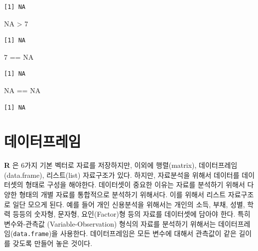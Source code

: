 \documentclass[
  letterpaper,
  chapter,a4paper,showtrims,openright,hidelinks]{oblivoir}
\newenvironment{Shaded}{\begin{snugshade}}{\end{snugshade}}
\newcommand{\ConstantTok}[1]{\textcolor[rgb]{0.56,0.35,0.01}{#1}}
\newcommand{\DecValTok}[1]{\textcolor[rgb]{0.68,0.00,0.00}{#1}}
\newcommand{\SpecialCharTok}[1]{\textcolor[rgb]{0.37,0.37,0.37}{#1}}
\begin{document}
\begin{verbatim}
[1] NA
\end{verbatim}

\begin{Shaded}
\begin{Highlighting}[]
\ConstantTok{NA} \SpecialCharTok{\textgreater{}} \DecValTok{7}
\end{Highlighting}
\end{Shaded}

\begin{verbatim}
[1] NA
\end{verbatim}

\begin{Shaded}
\begin{Highlighting}[]
\DecValTok{7} \SpecialCharTok{==} \ConstantTok{NA}
\end{Highlighting}
\end{Shaded}

\begin{verbatim}
[1] NA
\end{verbatim}

\begin{Shaded}
\begin{Highlighting}[]
\ConstantTok{NA} \SpecialCharTok{==} \ConstantTok{NA}
\end{Highlighting}
\end{Shaded}

\begin{verbatim}
[1] NA
\end{verbatim}

\hypertarget{uxb370uxc774uxd130uxd504uxb808uxc784}{%
\chapter{데이터프레임}\label{uxb370uxc774uxd130uxd504uxb808uxc784}}

\textbf{R} 은 6가지 기본 벡터로 자료를 저장하지만, 이외에 행렬(matrix),
데이터프레임(data.frame), 리스트(list) 자료구조가 있다. 하지만,
자료분석을 위해서 데이터를 데이터셋의 형태로 구성을 해야한다. 데이터셋이
중요한 이유는 자료를 분석하기 위해서 다양한 형태의 개별 자료를
통합적으로 분석하기 위해서다. 이를 위해서 리스트 자료구조로 일단 모으게
된다. 예를 들어 개인 신용분석을 위해서는 개인의 소득, 부채, 성별, 학력
등등의 숫자형, 문자형, 요인(Factor)형 등의 자료를 데이터셋에 담아야
한다. 특히 변수와-관측값 (Variable-Observation) 형식의 자료를 분석하기
위해서는 데이터프레임(\texttt{data.frame})을 사용한다. 데이터프레임은
모든 변수에 대해서 관측값이 같은 길이를 갖도록 만들어 놓은 것이다.
\end{document}
